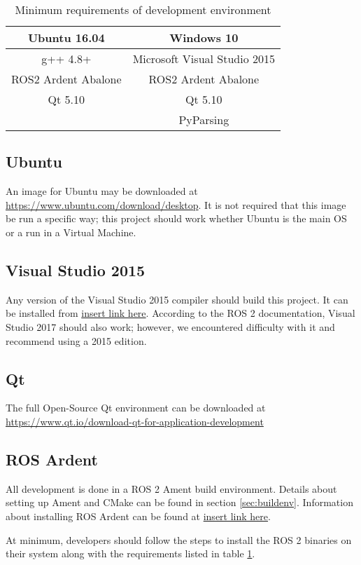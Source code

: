 \begin{table}
\centering
\begin{tabular}{c | c}
	Ubuntu 16.04 & Windows 10\\ \hline
	g++ 4.8+ & Microsoft Visual Studio 2015\\
	ROS2 Ardent Abalone & ROS2 Ardent Abalone\\
	Qt 5.10 & Qt 5.10\\
	& PyParsing\\
\end{tabular}
\caption{Minimum requirements of development environment}
\label{tab:min_reqs}
\end{table}

\subsection{Ubuntu}
An image for Ubuntu may be downloaded at \url{https://www.ubuntu.com/download/desktop}. It is not required that this image be run a specific way; this project should work whether Ubuntu is the main OS or a run in a Virtual Machine.

\subsection{Visual Studio 2015}
Any version of the Visual Studio 2015 compiler should build this project. It can be installed from \url{insert link here}. According to the ROS 2 documentation, Visual Studio 2017 should also work; however, we encountered difficulty with it and recommend using a 2015 edition.

\subsection{Qt}
The full Open-Source Qt environment can be downloaded at \\ \url{https://www.qt.io/download-qt-for-application-development}

\subsection{ROS Ardent}
All development is done in a ROS 2 Ament build environment. Details about setting up Ament and CMake can be found in section \ref{sec:buildenv}. Information about installing ROS Ardent can be found at \url{insert link here}.

At minimum, developers should follow the steps to install the ROS 2 binaries on their system along with the requirements listed in table \ref{tab:min_reqs}.

